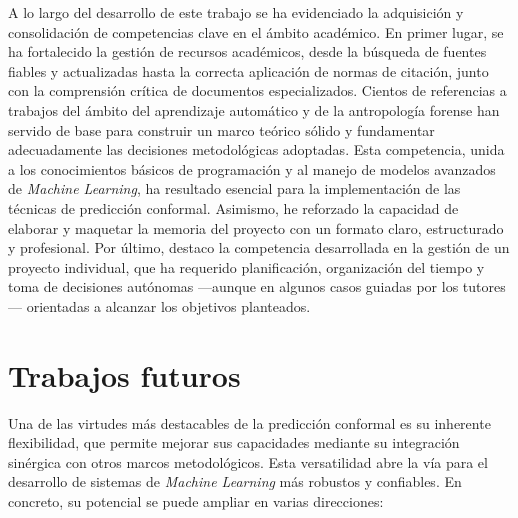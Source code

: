 A lo largo del desarrollo de este trabajo se ha evidenciado la adquisición y consolidación de competencias clave en el ámbito académico. En primer lugar, se ha fortalecido la gestión de recursos académicos, desde la búsqueda de fuentes fiables y actualizadas hasta la correcta aplicación de normas de citación, junto con la comprensión crítica de documentos especializados. Cientos de referencias a trabajos del ámbito del aprendizaje automático y de la antropología forense han servido de base para construir un marco teórico sólido y fundamentar adecuadamente las decisiones metodológicas adoptadas.
Esta competencia, unida a los conocimientos básicos de programación y al manejo de modelos avanzados de \textit{Machine Learning}, ha resultado esencial para la implementación de las técnicas de predicción conformal.
Asimismo, he reforzado la capacidad de elaborar y maquetar la memoria del proyecto con un formato claro, estructurado y profesional.
Por último, destaco la competencia desarrollada en la gestión de un proyecto individual, que ha requerido planificación, organización del tiempo y toma de decisiones autónomas ---aunque en algunos casos guiadas por los tutores--- orientadas a alcanzar los objetivos planteados.



\section{Trabajos futuros}

Una de las virtudes más destacables de la predicción conformal es su inherente flexibilidad, que permite mejorar sus capacidades mediante su integración sinérgica con otros marcos metodológicos. Esta versatilidad abre la vía para el desarrollo de sistemas de \textit{Machine Learning} más robustos y confiables. En concreto, su potencial se puede ampliar en varias direcciones:

